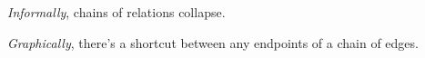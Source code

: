 
{\it Informally}, chains of relations collapse.

{\it Graphically}, there's a shortcut between any endpoints of a chain of 
edges.